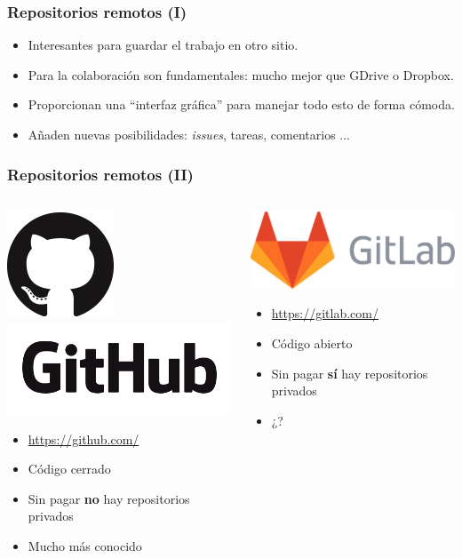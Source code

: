\documentclass{beamer}
\begin{document}
\begin{frame}\frametitle{Repositorios remotos (I)}

\begin{itemize}
	\item Interesantes para guardar el trabajo en otro sitio.
	\item Para la colaboración son fundamentales: mucho mejor que GDrive o Dropbox.
	\item Proporcionan una ``interfaz gráfica'' para manejar todo esto de forma cómoda.
	\item Añaden nuevas posibilidades: \textsl{issues}, tareas, comentarios ...
\end{itemize}


\end{frame}

\begin{frame}\frametitle{Repositorios remotos (II)}
	\begin{columns}
		\begin{column}{0.5\textwidth}
			\begin{center}
				\includegraphics[height = 1.3 cm]{fig/github/GitHub-Mark-120px-plus.png}
				\includegraphics[height = 1.3 cm]{fig/github/GitHub_Logo.png}
			\end{center}
			\begin{itemize}
				\item \url{https://github.com/}
				\item Código cerrado
				\item Sin pagar \textbf{no} hay repositorios privados
				\item Mucho más conocido
			\end{itemize}
		\end{column}
		\begin{column}{0.5\textwidth}
			\begin{center}
				\includegraphics[height = 1.3 cm]{fig/gitlab_wm_no_bg.pdf}
			\end{center}
			\begin{itemize}
				\item \url{https://gitlab.com/}
				\item Código abierto
				\item Sin pagar \textbf{sí} hay repositorios privados
				\item ¿?
			\end{itemize}
		\end{column}
	\end{columns}


\end{frame}
\end{document}
